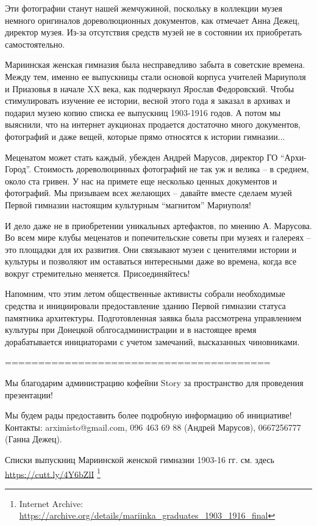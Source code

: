 Эти фотографии станут нашей жемчужиной, поскольку в коллекции музея немного
оригиналов дореволюционных документов, как отмечает Анна Дежец, директор музея.
Из-за отсутствия средств музей не в состоянии их приобретать самостоятельно.

Мариинская женская гимназия была несправедливо забыта в советские времена.
Между тем, именно ее выпускницы стали основой корпуса учителей Мариуполя и
Приазовья в начале XX века, как подчеркнул Ярослав Федоровский. Чтобы
стимулировать изучение ее истории, весной этого года я заказал в архивах и
подарил музею копию списка ее выпускниц 1903-1916 годов. А потом мы выяснили,
что на интернет аукционах продается достаточно много документов, фотографий и
даже вещей, которые прямо относятся к истории гимназии...

Меценатом может стать каждый, убежден Андрей Марусов, директор ГО \enquote{Архи-Город}.
Стоимость дореволюцинных фотографий не так уж и велика – в среднем, около ста
гривен. У нас на примете еще несколько ценных документов и фотографий. Мы
призываем всех желающих – давайте вместе сделаем музей Первой гимназии
настоящим культурным \enquote{магнитом} Мариуполя! 

И дело даже не в приобретении уникальных артефактов, по мнению А. Марусова. Во
всем мире клубы меценатов и попечительские советы при музеях и галереях – это
площадки для их развития. Они связывают музеи с ценителями истории и культуры и
позволяют им оставаться интересными даже во времена, когда все вокруг
стремительно меняется. Присоединяйтесь!

Напомним, что этим летом общественные активисты собрали необходимые средства и
инициировали предоставление зданию Первой гимназии статуса памятника
архитектуры. Подготовленная заявка была рассмотрена управлением культуры при
Донецкой облгосадминистрации и в настоящее время дорабатывается инициаторами с
учетом замечаний, высказанных чиновниками.

========================================

Мы благодарим администрацию кофейни Story за пространство для проведения презентации!

Мы будем рады предоставить более подробную информацию об инициативе! Контакты:
arximisto@gmail.com, 096 463 69 88 (Андрей Марусов), 0667256777 (Ганна Дежец).

Списки выпускниц Мариинской женской гимназии 1903-16 гг. см. здесь \url{https://cutt.ly/4Y6bZlI}
\footnote{Internet Archive: \url{https://archive.org/details/mariinka_graduates_1903_1916_final}}
